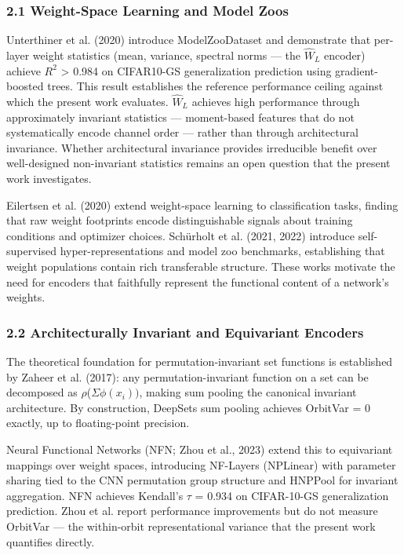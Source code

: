 
\subsubsection{2.1 Weight-Space Learning and Model Zoos}

Unterthiner et al. (2020) introduce ModelZooDataset and demonstrate that per-layer weight statistics (mean, variance, spectral norms --- the $\hat{W}_L$ encoder) achieve $R^2$ > 0.984 on CIFAR10-GS generalization prediction using gradient-boosted trees. This result establishes the reference performance ceiling against which the present work evaluates. $\hat{W}_L$ achieves high performance through approximately invariant statistics --- moment-based features that do not systematically encode channel order --- rather than through architectural invariance. Whether architectural invariance provides irreducible benefit over well-designed non-invariant statistics remains an open question that the present work investigates.

Eilertsen et al. (2020) extend weight-space learning to classification tasks, finding that raw weight footprints encode distinguishable signals about training conditions and optimizer choices. Schürholt et al. (2021, 2022) introduce self-supervised hyper-representations and model zoo benchmarks, establishing that weight populations contain rich transferable structure. These works motivate the need for encoders that faithfully represent the functional content of a network's weights.

\subsubsection{2.2 Architecturally Invariant and Equivariant Encoders}

The theoretical foundation for permutation-invariant set functions is established by Zaheer et al. (2017): any permutation-invariant function on a set can be decomposed as $\rho$($\Sigma \phi (x_{i}))$, making sum pooling the canonical invariant architecture. By construction, DeepSets sum pooling achieves OrbitVar = 0 exactly, up to floating-point precision.

Neural Functional Networks (NFN; Zhou et al., 2023) extend this to equivariant mappings over weight spaces, introducing NF-Layers (NPLinear) with parameter sharing tied to the CNN permutation group structure and HNPPool for invariant aggregation. NFN achieves Kendall's $\tau$ = 0.934 on CIFAR-10-GS generalization prediction. Zhou et al. report performance improvements but do not measure OrbitVar --- the within-orbit representational variance that the present work quantifies directly.

